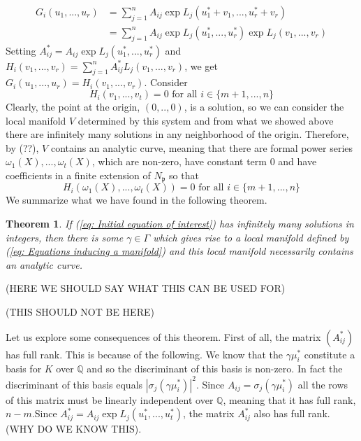 \documentclass{article}
\newtheorem{theorem}{Theorem}[section]
\newcommand{\mfrak}[1]{\mathfrak{#1}}
\newcommand{\mbb}[1]{\mathbb{#1}}
\begin{document}
\begin{align*}
    G_i(u_1, ..., u_r) &= \sum_{j = 1}^n A_{ij} \exp L_j(u_1^* + v_1, ..., u_r^* + v_r) \\ 
    &= \sum_{j = 1}^n A_{ij} \exp L_j(u_1^*, ..., u_r^*) \exp L_j(v_1, ..., v_r)
\end{align*}
Setting $A_{ij}^* = A_{ij} \exp L_j(u_1^*, ..., u_r^*)$ and $H_i(v_1, ..., v_r) = \sum_{j = 1}^n A_{ij}^* L_j(v_1, ..., v_r)$, we get
$G_i(u_1, ..., u_r) = H_i(v_1, ..., v_r)$. Consider
\begin{equation}\tag{\textdagger\textdagger\textdagger\textdagger}\label{eq: Equations inducing a manifold}
    H_i(v_1, ..., v_t) = 0 \text{ for all } i \in \{m+1, ..., n\}   
\end{equation}
Clearly, the point at the origin, $(0,..,0)$, is a solution, so we can consider the local manifold $V$ determined by this system and from what we showed above there are infinitely many solutions in any neighborhood of the origin. Therefore, by (??), $V$ contains an analytic curve, meaning that there are formal power series $\omega_1(X), ..., \omega_t(X)$, which are non-zero, have constant term 0 and have coefficients in a finite extension of $N_\mfrak p$ so that
\begin{equation}\tag{$\triangle$}\label{eq: Last reformulation of initial equations}
    H_i(\omega_1(X), ..., \omega_t(X)) = 0 \text{ for all } i \in \{m+1, ..., n\}
\end{equation}
We summarize what we have found in the following theorem.

\begin{theorem}\label{thm: Skolems method}
    If (\ref{eq: Initial equation of interest}) has infinitely many solutions in integers, then there is some $\gamma \in \Gamma$ which gives rise to a local manifold defined by (\ref{eq: Equations inducing a manifold}) and this local manifold necessarily contains an analytic curve. 
\end{theorem}

(HERE WE SHOULD SAY WHAT THIS CAN BE USED FOR)


(THIS SHOULD NOT BE HERE)

Let us explore some consequences of this theorem. First of all, the matrix $(A_{ij}^*)$ has full rank. This is because of the following. We know that the $\gamma \mu_i^*$ constitute a basis for $K$ over $\mbb{Q}$ and so the discriminant of this basis is non-zero. 
In fact the discriminant of this basis equals $|\sigma_j(\gamma \mu_i^*)|^2$. Since $A_{ij} = \sigma_j(\gamma \mu_i^*)$ all the rows of this matrix must be linearly independent over $\mbb Q$, meaning that it has full rank, $n-m$.Since $A_{ij}^* = A_{ij} \exp L_j(u_1^*, ..., u_t^*)$, the matrix $A_{ij}^*$ also has full rank. (WHY DO WE KNOW THIS). 
\end{document}
